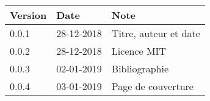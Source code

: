 \begin{table}[ht]
    \begin{tabular}{lll}
        Version & Date & Note \\
        \hline
        0.0.1 & 28-12-2018 & Titre, auteur et date \\ 
        0.0.2 & 28-12-2018 & Licence MIT \\ 
        0.0.3 & 02-01-2019 & Bibliographie \\ 
        0.0.4 & 03-01-2019 & Page de couverture \\ 
    \end{tabular}
\end{table}
